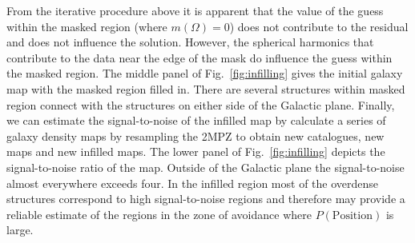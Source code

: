 \documentclass[useAMS,usenatbib]{mn2e}
\begin{document}
From the iterative procedure above it is apparent that the value of
the guess within the masked region (where $m(\Omega)=0$) does not
contribute to the residual and does not influence the solution.
However, the spherical harmonics that contribute to the data near the
edge of the mask do influence the guess within the masked region.  The
middle panel of Fig.~\ref{fig:infilling} gives the initial galaxy map
with the masked region filled in.  There are several structures within
masked region connect with the structures on either side of the
Galactic plane.  Finally, we can estimate the signal-to-noise of the
infilled map by calculate a series of galaxy density maps by
resampling the 2MPZ to obtain new catalogues, new maps and new
infilled maps.  The lower panel of Fig.~\ref{fig:infilling} depicts
the signal-to-noise ratio of the map.  Outside of the Galactic plane
the signal-to-noise almost everywhere exceeds four.  In the infilled
region most of the overdense structures correspond to high
signal-to-noise regions and therefore may provide a reliable estimate
of the regions in the zone of avoidance where $P(\mathrm{Position})$
is large.
\end{document}
